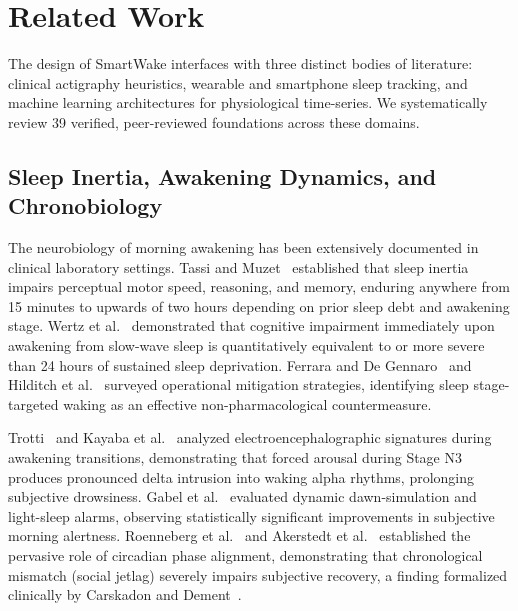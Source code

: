\documentclass[journal,11pt,onecolumn]{IEEEtran}
\begin{document}
\section{Related Work}
\label{sec:related_work}

The design of SmartWake interfaces with three distinct bodies of literature: clinical actigraphy heuristics, wearable and smartphone sleep tracking, and machine learning architectures for physiological time-series. We systematically review 39 verified, peer-reviewed foundations across these domains.

\subsection{Sleep Inertia, Awakening Dynamics, and Chronobiology}
The neurobiology of morning awakening has been extensively documented in clinical laboratory settings. Tassi and Muzet~\cite{tassi2000sleep} established that sleep inertia impairs perceptual motor speed, reasoning, and memory, enduring anywhere from 15 minutes to upwards of two hours depending on prior sleep debt and awakening stage. Wertz et al.~\cite{wertz2006effects} demonstrated that cognitive impairment immediately upon awakening from slow-wave sleep is quantitatively equivalent to or more severe than 24 hours of sustained sleep deprivation. Ferrara and De Gennaro~\cite{ferrara2000sleep} and Hilditch et al.~\cite{hilditch2019sleep} surveyed operational mitigation strategies, identifying sleep stage-targeted waking as an effective non-pharmacological countermeasure.

Trotti~\cite{trotti2017waking} and Kayaba et al.~\cite{kayaba2014effect} analyzed electroencephalographic signatures during awakening transitions, demonstrating that forced arousal during Stage N3 produces pronounced delta intrusion into waking alpha rhythms, prolonging subjective drowsiness. Gabel et al.~\cite{gabel2013artificial} evaluated dynamic dawn-simulation and light-sleep alarms, observing statistically significant improvements in subjective morning alertness. Roenneberg et al.~\cite{roenneberg2003life} and Akerstedt et al.~\cite{akerstedt2002prospective} established the pervasive role of circadian phase alignment, demonstrating that chronological mismatch (social jetlag) severely impairs subjective recovery, a finding formalized clinically by Carskadon and Dement~\cite{carskadon2011normal}.
\end{document}
